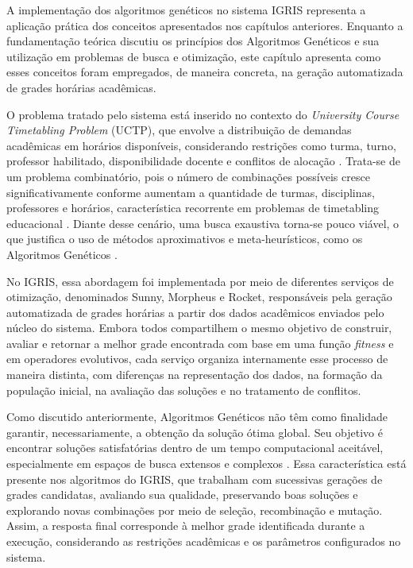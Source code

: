 ﻿A implementação dos algoritmos genéticos no sistema IGRIS representa a aplicação prática dos conceitos apresentados nos capítulos anteriores. Enquanto a fundamentação teórica discutiu os princípios dos Algoritmos Genéticos e sua utilização em problemas de busca e otimização, este capítulo apresenta como esses conceitos foram empregados, de maneira concreta, na geração automatizada de grades horárias acadêmicas.

O problema tratado pelo sistema está inserido no contexto do \textit{University Course Timetabling Problem} (UCTP), que envolve a distribuição de demandas acadêmicas em horários disponíveis, considerando restrições como turma, turno, professor habilitado, disponibilidade docente e conflitos de alocação \cite{premananda2024}. Trata-se de um problema combinatório, pois o número de combinações possíveis cresce significativamente conforme aumentam a quantidade de turmas, disciplinas, professores e horários, característica recorrente em problemas de timetabling educacional \cite{ceschia2023}. Diante desse cenário, uma busca exaustiva torna-se pouco viável, o que justifica o uso de métodos aproximativos e meta-heurísticos, como os Algoritmos Genéticos \cite{eiben2015}.

No IGRIS, essa abordagem foi implementada por meio de diferentes serviços de otimização, denominados Sunny, Morpheus e Rocket, responsáveis pela geração automatizada de grades horárias a partir dos dados acadêmicos enviados pelo núcleo do sistema. Embora todos compartilhem o mesmo objetivo de construir, avaliar e retornar a melhor grade encontrada com base em uma função \textit{fitness} e em operadores evolutivos, cada serviço organiza internamente esse processo de maneira distinta, com diferenças na representação dos dados, na formação da população inicial, na avaliação das soluções e no tratamento de conflitos.

Como discutido anteriormente, Algoritmos Genéticos não têm como finalidade garantir, necessariamente, a obtenção da solução ótima global. Seu objetivo é encontrar soluções satisfatórias dentro de um tempo computacional aceitável, especialmente em espaços de busca extensos e complexos \cite{goldberg1989}. Essa característica está presente nos algoritmos do IGRIS, que trabalham com sucessivas gerações de grades candidatas, avaliando sua qualidade, preservando boas soluções e explorando novas combinações por meio de seleção, recombinação e mutação. Assim, a resposta final corresponde à melhor grade identificada durante a execução, considerando as restrições acadêmicas e os parâmetros configurados no sistema.
